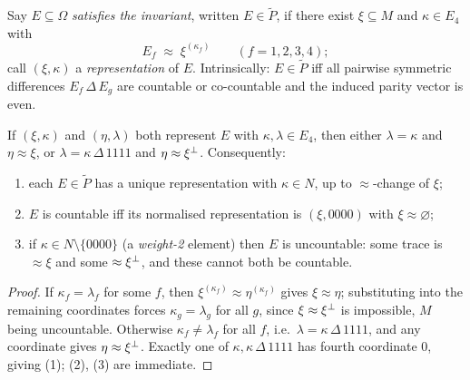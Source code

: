 \begin{definition}\label{def:invariant}
Say $E\subseteq\Omega$ \emph{satisfies the invariant}, written
$E\in\widetilde P$, if there exist $\xi\subseteq M$ and $\kappa\in E_4$ with
\[
  E_f \;\approx\; \xi^{(\kappa_f)} \qquad (f=1,2,3,4);
\]
call $(\xi,\kappa)$ a \emph{representation} of $E$. Intrinsically:
$E\in\widetilde P$ iff all pairwise symmetric differences $E_f\,\Delta\,E_g$ are
countable or co-countable and the induced parity vector is even.
\end{definition}

\begin{lemma}\label{lem:rep-rigidity}
If $(\xi,\kappa)$ and $(\eta,\lambda)$ both represent $E$ with
$\kappa,\lambda\in E_4$, then either $\lambda=\kappa$ and $\eta\approx\xi$, or
$\lambda=\kappa\,\Delta\,1111$ and $\eta\approx\xi{}^{\perp}$. Consequently:
\begin{enumerate}[label=\textup{(\arabic*)}]
  \item each $E\in\widetilde P$ has a unique representation with $\kappa\in N$,
    up to $\approx$-change of $\xi$;
  \item $E$ is countable iff its normalised representation is $(\xi,0000)$ with
    $\xi\approx\varnothing$;
  \item if $\kappa\in N\setminus\{0000\}$ (a \emph{weight-2} element) then $E$ is
    uncountable: some trace is $\approx\xi$ and some $\approx\xi{}^{\perp}$, and these
    cannot both be countable.
\end{enumerate}
\end{lemma}

\begin{proof}
If $\kappa_f=\lambda_f$ for some $f$, then $\xi^{(\kappa_f)}\approx\eta^{(\kappa_f)}$
gives $\xi\approx\eta$; substituting into the remaining coordinates forces
$\kappa_g=\lambda_g$ for all $g$, since $\xi\approx\xi{}^{\perp}$ is impossible, $M$
being uncountable. Otherwise $\kappa_f\neq\lambda_f$ for all $f$, i.e.\
$\lambda=\kappa\,\Delta\,1111$, and any coordinate gives $\eta\approx\xi{}^{\perp}$.
Exactly one of $\kappa,\kappa\,\Delta\,1111$ has fourth coordinate $0$, giving
(1); (2), (3) are immediate.
\end{proof}

